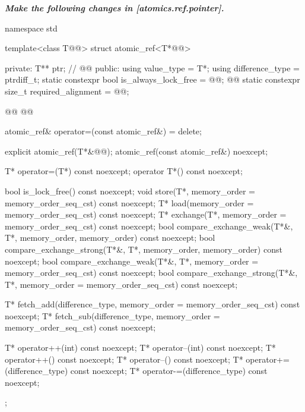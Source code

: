 \textbf{\textit{Make the following changes in [atomics.ref.pointer].}} \\

\begin{codeblock}
namespace std {
  template<class T@@> struct atomic_ref<T*@@> {
  private:
    T** ptr;              // \expos
    @@
  public:
    using value_type = T*;
    using difference_type = ptrdiff_t;
    static constexpr bool is_always_lock_free = @@;
    @@
    static constexpr size_t required_alignment = @@;

    @@
    @@

    atomic_ref& operator=(const atomic_ref&) = delete;

    explicit atomic_ref(T*&@@);
    atomic_ref(const atomic_ref&) noexcept;

    T* operator=(T*) const noexcept;
    operator T*() const noexcept;

    bool is_lock_free() const noexcept;
    void store(T*, memory_order = memory_order_seq_cst) const noexcept;
    T* load(memory_order = memory_order_seq_cst) const noexcept;
    T* exchange(T*, memory_order = memory_order_seq_cst) const noexcept;
    bool compare_exchange_weak(T*&, T*,
                               memory_order, memory_order) const noexcept;
    bool compare_exchange_strong(T*&, T*,
                                 memory_order, memory_order) const noexcept;
    bool compare_exchange_weak(T*&, T*,
                               memory_order = memory_order_seq_cst) const noexcept;
    bool compare_exchange_strong(T*&, T*,
                                 memory_order = memory_order_seq_cst) const noexcept;

    T* fetch_add(difference_type, memory_order = memory_order_seq_cst) const noexcept;
    T* fetch_sub(difference_type, memory_order = memory_order_seq_cst) const noexcept;

    T* operator++(int) const noexcept;
    T* operator--(int) const noexcept;
    T* operator++() const noexcept;
    T* operator--() const noexcept;
    T* operator+=(difference_type) const noexcept;
    T* operator-=(difference_type) const noexcept;
  };
}
\end{codeblock}

